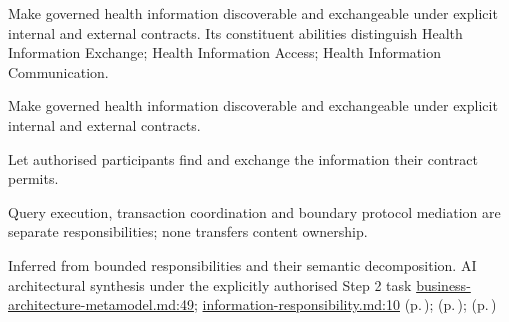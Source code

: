 Make governed health information discoverable and exchangeable under explicit internal and external contracts. Its constituent abilities distinguish Health Information Exchange; Health Information Access; Health Information Communication.



Make governed health information discoverable and exchangeable under explicit internal and external contracts.



Let authorised participants find and exchange the information their contract permits.



Query execution, transaction coordination and boundary protocol mediation are separate responsibilities; none transfers content ownership.


Inferred from bounded responsibilities and their semantic decomposition. AI architectural synthesis under the explicitly authorised Step 2 task \hyperref[evidence:4bac85accd34ce0b]{business-architecture-metamodel.md:49}; \hyperref[evidence:be61392fefb4bb10]{information-responsibility.md:10}
 (p.\,\pageref{cap:bec-health-information-exchange});  (p.\,\pageref{cap:bec-health-information-access});  (p.\,\pageref{cap:bec-reviewed-health-information-communication})
